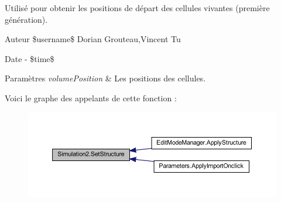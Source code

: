 Utilisé pour obtenir les positions de départ des cellules vivantes (première génération). 

\begin{DoxyAuthor}{Auteur}
\$username\$ Dorian Grouteau,Vincent Tu 
\end{DoxyAuthor}
\begin{DoxyDate}{Date}
-\/ \$time\$ 
\begin{DoxyParams}{Paramètres}
{\em volume\+Position} & Les positions des cellules.\\
\hline
\end{DoxyParams}

\end{DoxyDate}
Voici le graphe des appelants de cette fonction \+:
\nopagebreak
\begin{figure}[H]
\begin{center}
\leavevmode
\includegraphics[width=350pt]{class_simulation2_a8508ba06258751760b848e98c57ce06d_icgraph}
\end{center}
\end{figure}
\mbox{\label{class_simulation2_ac4ade01f70c0b453d51a62be9d50e2ae}} 
